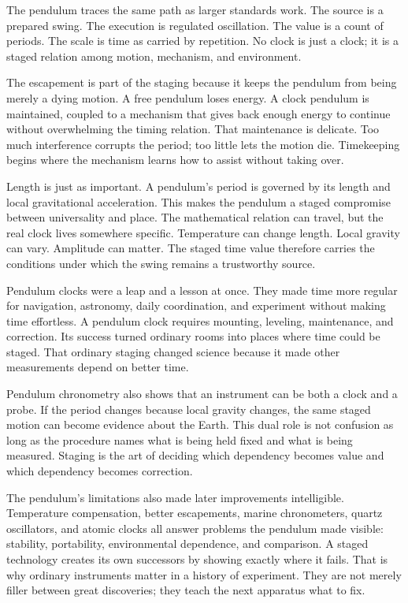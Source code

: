 The pendulum traces the same path as larger standards work. The source is a
prepared swing. The execution is regulated oscillation. The value is a count
of periods. The scale is time as carried by repetition. No clock is just a
clock; it is a staged relation among motion, mechanism, and environment.

The escapement is part of the staging because it keeps the pendulum from
being merely a dying motion. A free pendulum loses energy. A clock pendulum is
maintained, coupled to a mechanism that gives back enough energy to continue
without overwhelming the timing relation. That maintenance is delicate. Too
much interference corrupts the period; too little lets the motion die.
Timekeeping begins where the mechanism learns how to assist without taking
over.

Length is just as important. A pendulum's period is governed by its length
and local gravitational acceleration. This makes the pendulum a staged
compromise between universality and place. The mathematical relation can
travel, but the real clock lives somewhere specific. Temperature can change
length. Local gravity can vary. Amplitude can matter. The staged time value
therefore carries the conditions under which the swing remains a trustworthy
source.

Pendulum clocks were a leap and a lesson at once. They made time more
regular for navigation, astronomy, daily coordination, and experiment
without making time effortless. A pendulum clock requires mounting, leveling,
maintenance, and correction. Its success turned ordinary rooms into places
where time could be staged. That ordinary staging changed science because it
made other measurements depend on better time.

Pendulum chronometry also shows that an instrument can be both a clock and a
probe. If the period changes because local gravity changes, the same staged
motion can become evidence about the Earth. This dual role is not confusion
as long as the procedure names what is being held fixed and what is being
measured. Staging is the art of deciding which dependency becomes value and
which dependency becomes correction.

The pendulum's limitations also made later improvements intelligible.
Temperature compensation, better escapements, marine chronometers, quartz
oscillators, and atomic clocks all answer problems the pendulum made visible:
stability, portability, environmental dependence, and comparison. A staged
technology creates its own successors by showing exactly where it fails. That
is why ordinary instruments matter in a history of experiment. They are not
merely filler between great discoveries; they teach the next apparatus what
to fix.


